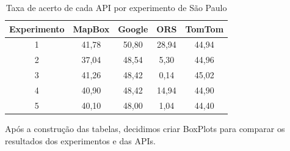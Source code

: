 \begin{table}[!ht]
  \centering
  \caption{Taxa de acerto de cada API por experimento de São Paulo}
  \label{tab:txAcerExpAPISP}
  \begin{adjustbox}{width=0.7\textwidth}
  \begin{tabular}{|c|c|c|c|c|}
  \hline
  Experimento & MapBox & Google & ORS & TomTom\\
  \hline
  1 & 41,78 & 50,80 & 28,94 & 44,94\\
  \hline
  2 & 37,04 & 48,54 & 5,30 & 44,96\\
  \hline
  3 & 41,26 & 48,42 & 0,14 & 45,02\\
  \hline
  4 & 40,90 & 48,42 & 14,94 & 44,90\\
  \hline
  5 & 40,10 & 48,00 & 1,04 & 44,40\\
  \hline
  \end{tabular}
  \end{adjustbox}
\end{table}

Após a construção das tabelas, decidimos criar BoxPlots para comparar os resultados dos experimentos e das APIs.





